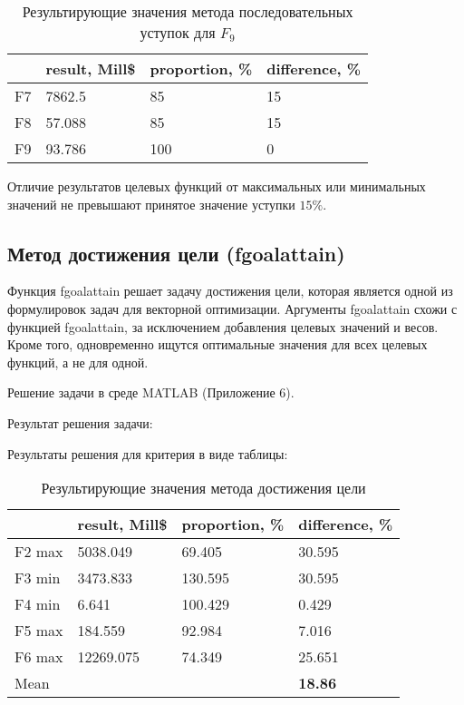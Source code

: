 \begin{table}[h!]
	\centering
	\bgroup
	\captionsetup{singlelinecheck = false, format= hang, justification=raggedleft, font=footnotesize, labelsep=space}
	\caption{Результирующие значения метода последовательных уступок для $F_9$}
	\def\arraystretch{1}
	\begin{tabular}{ | m{1.2cm} | m{1.9cm} | m{2.2cm} | m{2.2cm} | }
		\hline
		& result, Mill\$ & proportion, \% & difference, \% \\ \hline
		F7 & 7862.5 & 85 & 15 \\ \hline
		F8 & 57.088 & 85 & 15 \\ \hline
		F9 & 93.786 & 100 & 0 \\
		\hline
	\end{tabular}
	\egroup
\end{table}

Отличие результатов целевых функций от максимальных или минимальных значений не превышают принятое значение уступки $15\%$.

\subsection{Метод достижения цели (fgoalattain)}

Функция fgoalattain решает задачу достижения цели, которая является одной из формулировок задач для векторной оптимизации. Аргументы fgoalattain схожи с функцией fgoalattain, за исключением добавления целевых значений и весов. Кроме того, одновременно ищутся оптимальные значения для всех целевых  функций, а не для одной.

Решение задачи в среде MATLAB (Приложение 6).

Результат решения задачи:



Результаты решения для критерия в виде таблицы:

\begin{table}[h!]
	\centering
	\bgroup
	\captionsetup{singlelinecheck = false, format= hang, justification=raggedleft, font=footnotesize, labelsep=space}
	\caption{Результирующие значения метода достижения цели}
	\def\arraystretch{1}
	\begin{tabular}{ | m{1.5cm} | m{1.9cm} | m{2.2cm} | m{2.2cm} | }
		\hline
		& result, Mill\$ & proportion, \% & difference, \% \\ \hline
		F2 max & 5038.049 & 69.405 & 30.595 \\ \hline
		F3 min & 3473.833 & 130.595 & 30.595 \\ \hline
		F4 min & 6.641 & 100.429 & 0.429 \\ \hline
		F5 max & 184.559 & 92.984 & 7.016 \\ \hline
		F6 max & 12269.075 & 74.349 & 25.651 \\ \hline
		Mean & & & \textbf{18.86} \\
		\hline
	\end{tabular}
	\egroup
\end{table}

